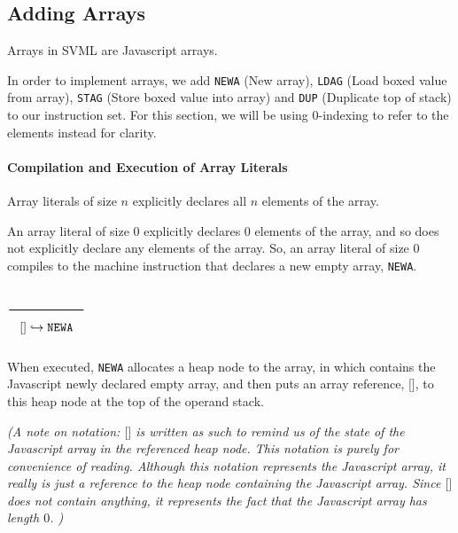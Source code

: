 
\newcommand{\qed}{$\Box$}
\newcommand{\Rule}[2]{\genfrac{}{}{0.7pt}{}{{\setlength{\fboxrule}{0pt}\setlength{\fboxsep}{3mm}\fbox{$#1$}}}{{\setlength{\fboxrule}{0pt}\setlength{\fboxsep}{3mm}\fbox{$#2$}}}}
\newcommand{\Rulee}[3]{\genfrac{}{}{0.7pt}{}{{\setlength{\fboxrule}{0pt}\setlength{\fboxsep}{3mm}\fbox{$#1$}}}{{\setlength{\fboxrule}{0pt}\setlength{\fboxsep}{3mm}\fbox{$#2$}}}[#3]}
\newcommand{\transition}{\rightrightarrows_s}
\newcommand{\translate}{\twoheadrightarrow}
\newcommand{\translateaux}{\hookrightarrow}

\subsection{Adding Arrays}
Arrays in SVML are Javascript arrays.

In order to implement arrays, we add \texttt{NEWA} (New array),
\texttt{LDAG} (Load boxed value from array),
\texttt{STAG} (Store boxed value into array) and \texttt{DUP}
(Duplicate top of stack) to our instruction set. For this section,
we will be using 0-indexing to refer to the elements instead for clarity.

\paragraph{Compilation and Execution of Array Literals}
Array literals of size $n$ explicitly declares all $n$ elements of the array.

An array literal of size $0$ explicitly declares $0$ elements of the array, and so does not explicitly declare any elements of the array.
So, an array literal of size $0$ compiles to the machine instruction that declares a new empty array, \texttt{NEWA}.

$\Rule{}{\lbrack\rbrack \translateaux \texttt{NEWA}}$

When executed, \texttt{NEWA} allocates a heap node to the array, in which contains the Javascript newly declared empty array, and then puts an array reference, $\lbrack\rbrack$, to this heap node at the top of the operand stack.

\textit{(A note on notation: $\lbrack\rbrack$ is written as such to remind us of the state of the Javascript array in the referenced heap node. This notation is purely for convenience of reading.
Although this notation represents the Javascript array, it really is just a reference to the heap node containing the Javascript array.
Since $\lbrack\rbrack$ does not contain anything, it represents the fact that the Javascript array has length $0$.
)}


